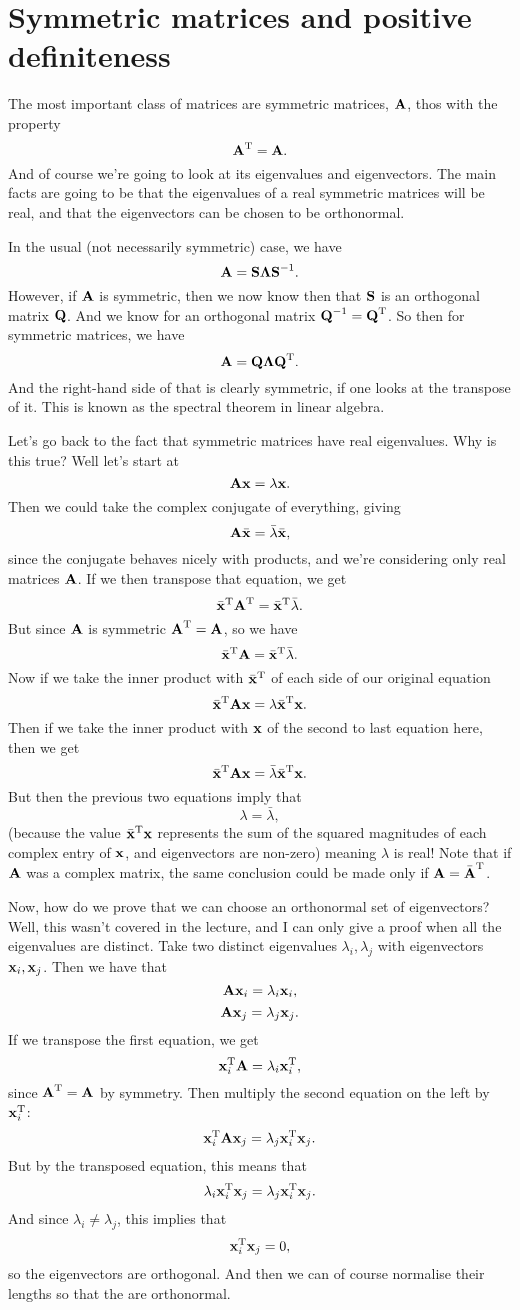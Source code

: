 \section{Symmetric matrices and positive definiteness}

The most important class of matrices are symmetric matrices, $\mA$, thos with the property
\[ \T\mA = \mA. \]
And of course we're going to look at its eigenvalues and eigenvectors. The main facts are going to be that the eigenvalues of a real symmetric matrices will be real, and that the eigenvectors can be chosen to be orthonormal.

In the usual (not necessarily symmetric) case, we have
\[ \mA = \mS \mLa \mS^{-1}. \]
However, if $\mA$ is symmetric, then we now know then that $\mS$ is an orthogonal matrix $\mQ$. And we know for an orthogonal matrix $\mQ^{-1} = \T\mQ$. So then for symmetric matrices, we have
\[ \mA = \mQ\mLa\T\mQ. \]
And the right-hand side of that is clearly symmetric, if one looks at the transpose of it. This is known as the spectral theorem in linear algebra.

Let's go back to the fact that symmetric matrices have real eigenvalues. Why is this true? Well let's start at
\[ \mA \vx = \lambda \vx. \]
Then we could take the complex conjugate of everything, giving
\[ \mA \bar{\vx} = \bar{\lambda} \bar{\vx}, \]
since the conjugate behaves nicely with products, and we're considering only real matrices $\mA$. If we then transpose that equation, we get
\[ \T{\bar{\vx}} \T\mA = \T{\bar{\vx}} \bar{\lambda}. \]
But since $\mA$ is symmetric $\T\mA = \mA$, so we have
\[ \T{\bar{\vx}} \mA = \T{\bar{\vx}} \bar{\lambda}. \]
Now if we take the inner product with $\T{\bar{\vx}}$ of each side of our original equation
\[ \T{\bar\vx} \mA \vx = \lambda\T{\bar\vx}\vx. \]
Then if we take the inner product with $\vx$ of the second to last equation here, then we get
\[ \T{\bar\vx} \mA \vx = \bar\lambda\T{\bar\vx}\vx. \]
But then the previous two equations imply that
\[ \lambda = \bar\lambda, \]
(because the value $\T{\bar\vx}\vx$ represents the sum of the squared magnitudes of each complex entry of $\vx$, and eigenvectors are non-zero) meaning $\lambda$ is real!
\brm
Note that if $\mA$ was a complex matrix, the same conclusion could be made only if $\mA = \T{\bar\mA}$.
\erm

Now, how do we prove that we can choose an orthonormal set of eigenvectors? Well, this wasn't covered in the lecture, and I can only give a proof when all the eigenvalues are distinct. Take two distinct eigenvalues $\lambda_i, \lambda_j$ with eigenvectors $\vx_i, \vx_j$. Then we have that
\[ \mA\vx_i = \lambda_i\vx_i, \]
\[ \mA\vx_j = \lambda_j\vx_j. \]
If we transpose the first equation, we get
\[ \T{\vx_i}\mA = \lambda_i \T{\vx_i}, \]
since $\T\mA = \mA$ by symmetry. Then multiply the second equation on the left by $\T{\vx_i}$:
\[ \T{\vx_i}\mA \vx_j = \lambda_j \T{\vx_i} \vx_j. \]
But by the transposed equation, this means that 
\[ \lambda_i \T{\vx_i} \vx_j = \lambda_j \T{\vx_i} \vx_j. \]
And since $\lambda_i \ne \lambda_j$, this implies that
\[ \T{\vx_i} \vx_j = 0, \]
so the eigenvectors are orthogonal. And then we can of course normalise their lengths so that the are orthonormal.

